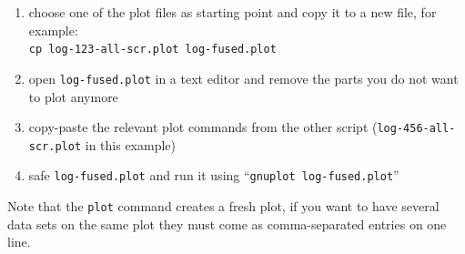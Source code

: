 \documentclass[a4paper,10pt]{article}
\begin{document}
\begin{enumerate}
\item
  choose one of the plot files as starting point and copy it to a new file, for example:\\
  \texttt{cp log-123-all-scr.plot log-fused.plot}
\item
  open \texttt{log-fused.plot} in a text editor and remove the parts you do not want to plot anymore
\item
  copy-paste the relevant plot commands from the other script (\texttt{log-456-all-scr.plot} in this example)
\item
  safe \texttt{log-fused.plot} and run it using ``\texttt{gnuplot log-fused.plot}''
\end{enumerate}

Note that the \texttt{plot} command creates a fresh plot, if you want to have several data sets on the same plot they must come as comma-separated entries on one line.



\footnotesize


\end{document}
